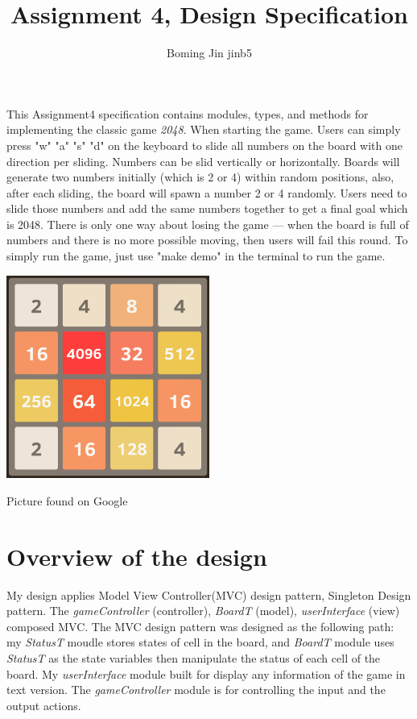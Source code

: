 \documentclass[12pt]{article}
\title{Assignment 4, Design Specification}
\author{Boming Jin jinb5}
\begin{document}
\maketitle
This Assignment4 specification contains modules, types, and methods for implementing the classic game \textit{2048}. When starting the game.
Users can simply press "w" "a" "s" "d" on the keyboard to slide all numbers on the board with one direction per sliding. 
Numbers can be slid vertically or horizontally. Boards will generate two numbers initially (which is 2 or 4) within random positions,
also, after each sliding, the board will spawn a number 2 or 4 randomly. Users need to slide those numbers and add the same numbers together
to get a final goal which is 2048. There is only one way about losing the game --- when the board is full of numbers and there is no more
possible moving, then users will fail this round. To simply run the game, just use "make demo" in the terminal to run the game.

\begin{center}
  \includegraphics[width=0.5\textwidth]{2048.png}

  Picture found on Google
\end{center}

\newpage

\section{Overview of the design}

My design applies Model View Controller(MVC) design pattern, Singleton Design pattern. The \textit{gameController} (controller),
\textit{BoardT} (model), \textit{userInterface} (view) composed MVC. The MVC design pattern was designed as the following path: 
my \textit{StatusT} moudle stores states of cell in the board, and \textit{BoardT} module uses \textit{StatusT} as the state variables
then manipulate the status of each cell of the board. My \textit{userInterface} module built for display any information of the game in
text version. The \textit{gameController} module is for controlling the input and the output actions. 
\end{document}
